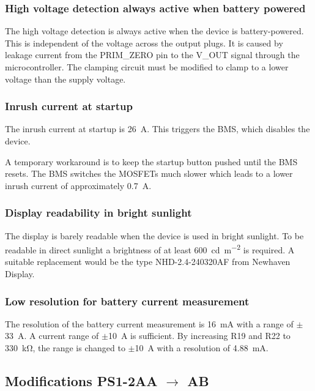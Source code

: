 \subsubsection{High voltage detection always active when battery powered}
The high voltage detection is always active when the device is battery-powered. This is independent of the voltage across the output plugs. It is caused by leakage current from the PRIM\_ZERO pin to the V\_OUT signal through the microcontroller. 
The clamping circuit must be modified to clamp to a lower voltage than the supply voltage. 

\subsubsection{Inrush current at startup}
The inrush current at startup is \qty{26}{\ampere}. This triggers the BMS, which disables the device. 

A temporary workaround is to keep the startup button pushed until the BMS resets. The BMS switches the \acp{MOSFET} much slower which leads to a lower inrush current of approximately \qty{0.7}{\ampere}. 


\subsubsection{Display readability in bright sunlight}
The display is barely readable when the device is used in bright sunlight. To be readable in direct sunlight a brightness of at least \qty{600}{\candela\per\square\meter} is required. A suitable replacement would be the type NHD-2.4-240320AF from Newhaven Display. 

\subsubsection{Low resolution for battery current measurement}
The resolution of the battery current measurement is \qty{16}{\milli\ampere} with a range of $\pm$\qty{33}{\ampere}. A current range of $\pm$\qty{10}{\ampere} is sufficient. By increasing R19 and R22 to \qty{330}{\kilo\ohm}, the range is changed to $\pm$\qty{10}{\ampere} with a resolution of \qty{4.88}{\milli\ampere}. 

\subsection{Modifications PS1-2AA $\to$ AB}

